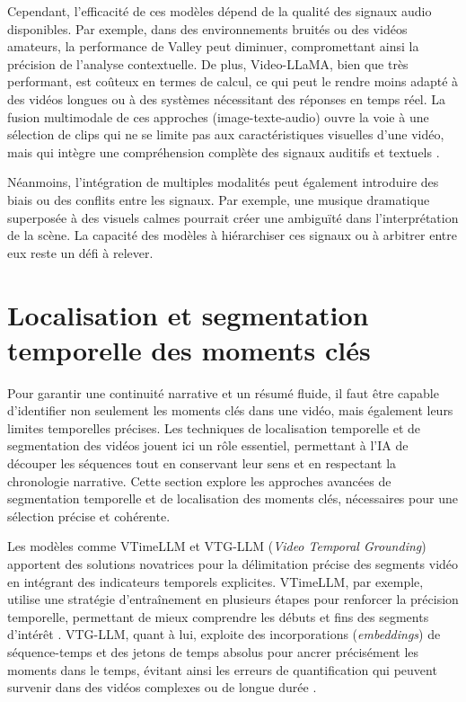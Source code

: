 Cependant, l’efficacité de ces modèles dépend de la qualité des signaux audio disponibles. Par exemple, dans des environnements bruités ou des vidéos amateurs, la performance de Valley peut diminuer, compromettant ainsi la précision de l’analyse contextuelle. De plus, Video-LLaMA, bien que très performant, est coûteux en termes de calcul, ce qui peut le rendre moins adapté à des vidéos longues ou à des systèmes nécessitant des réponses en temps réel. La fusion multimodale de ces approches (image-texte-audio) ouvre la voie à une sélection de clips qui ne se limite pas aux caractéristiques visuelles d’une vidéo, mais qui intègre une compréhension complète des signaux auditifs et textuels \cite{wang2024_hawkeye}\cite{anonymous2017_localizing}.

Néanmoins, l’intégration de multiples modalités peut également introduire des biais ou des conflits entre les signaux. Par exemple, une musique dramatique superposée à des visuels calmes pourrait créer une ambiguïté dans l’interprétation de la scène. La capacité des modèles à hiérarchiser ces signaux ou à arbitrer entre eux reste un défi à relever.

\section{Localisation et segmentation temporelle des moments clés}

Pour garantir une continuité narrative et un résumé fluide, il faut être capable d’identifier non seulement les moments clés dans une vidéo, mais également leurs limites temporelles précises. Les techniques de localisation temporelle et de segmentation des vidéos jouent ici un rôle essentiel, permettant à l’IA de découper les séquences tout en conservant leur sens et en respectant la chronologie narrative. Cette section explore les approches avancées de segmentation temporelle et de localisation des moments clés, nécessaires pour une sélection précise et cohérente.

Les modèles comme VTimeLLM \cite{huang2024_vtimeLLM} et VTG-LLM (\textit{Video Temporal Grounding}) \cite{guo2024_vtgLLM} apportent des solutions novatrices pour la délimitation précise des segments vidéo en intégrant des indicateurs temporels explicites. VTimeLLM, par exemple, utilise une stratégie d’entraînement en plusieurs étapes pour renforcer la précision temporelle, permettant de mieux comprendre les débuts et fins des segments d’intérêt \cite{han2024_clip}\cite{lei2021_clipbert}. VTG-LLM, quant à lui, exploite des incorporations (\textit{embeddings}) de séquence-temps et des jetons de temps absolus pour ancrer précisément les moments dans le temps, évitant ainsi les erreurs de quantification qui peuvent survenir dans des vidéos complexes ou de longue durée \cite{guo2024_vtgLLM}\cite{you2023_ferret}.

